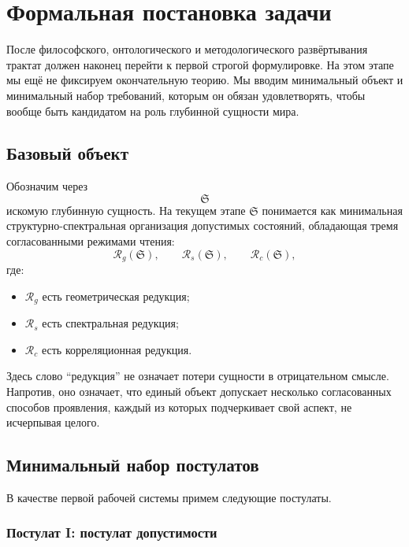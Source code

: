 \documentclass[12pt,a4paper]{article}
\begin{document}
\section{Формальная постановка задачи}

После философского, онтологического и методологического развёртывания трактат должен наконец перейти к первой строгой формулировке. На этом этапе мы ещё не фиксируем окончательную теорию. Мы вводим минимальный объект и минимальный набор требований, которым он обязан удовлетворять, чтобы вообще быть кандидатом на роль глубинной сущности мира.

\subsection{Базовый объект}

Обозначим через
\[
\mathfrak{S}
\]
искомую глубинную сущность. На текущем этапе \(\mathfrak{S}\) понимается как минимальная структурно-спектральная организация допустимых состояний, обладающая тремя согласованными режимами чтения:
\begin{equation}
\mathcal{R}_g(\mathfrak{S}),\qquad \mathcal{R}_s(\mathfrak{S}),\qquad \mathcal{R}_c(\mathfrak{S}),
\end{equation}
где:
\begin{itemize}
    \item \(\mathcal{R}_g\) есть геометрическая редукция;
    \item \(\mathcal{R}_s\) есть спектральная редукция;
    \item \(\mathcal{R}_c\) есть корреляционная редукция.
\end{itemize}

Здесь слово ``редукция'' не означает потери сущности в отрицательном смысле. Напротив, оно означает, что единый объект допускает несколько согласованных способов проявления, каждый из которых подчеркивает свой аспект, не исчерпывая целого.

\subsection{Минимальный набор постулатов}

В качестве первой рабочей системы примем следующие постулаты.

\subsubsection*{Постулат I: постулат допустимости}
\end{document}
